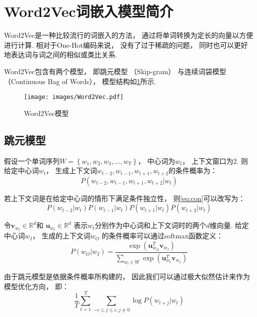 \section{Word2Vec词嵌入模型简介}

Word2Vec是一种比较流行的词嵌入的方法，
通过将单词转换为定长的向量以方便进行计算.
相对于One-Hot编码来说，
没有了过于稀疏的问题，
同时也可以更好地表达词与词之间的相似或类比关系.

Word2Vec包含有两个模型，
即跳元模型\cite{mikolovDistributedRepresentationsWords2013}
（Skip-gram）
与连续词袋模型\cite{mikolovEfficientEstimationWord2013}
（Continuous Bag of Words），
模型结构如\cref{fig:Word2Vec}所示.

\begin{figure}[!htbp]
    \centering
    \texttt{[image: images/Word2Vec.pdf]}
    \caption{Word2Vec模型}\label{fig:Word2Vec}
\end{figure}

\subsection{跳元模型}

假设一个单词序列$W = \left\{w_1, w_2, w_3, \ldots, w_T\right\}$，
中心词为$w_t$，
上下文窗口为$2$.
则给定中心词$w_t$，
生成上下文词$w_{t-2}, w_{t-1}, w_{t+1}, w_{t+2}$的条件概率为：
\begin{equation}
    \label{eq:con}
    P(w_{t-2}, w_{t-1}, w_{t+1}, w_{t+2}|w_t)
\end{equation}

若上下文词是在给定中心词的情形下满足条件独立性，
则\cref{eq:con}可以改写为：
\begin{equation}
    P(w_{t-2}|w_t)P(w_{t-1}|w_t)P(w_{t+1}|w_t)P(w_{t+2}|w_t)
\end{equation}

令$\mathbf{v}_{w_t}\in\mathbb{R}^d$和
$\mathbf{u}_{w_t}\in\mathbb{R}^d$
表示$w_t$分别作为中心词和上下文词时的两个$d$维向量.
给定中心词$w_I$，
生成的上下文词$w_O$
的条件概率可以通过softmax函数定义：
\begin{equation}
    P\left(w_O|w_I\right) = \frac{\exp\left(\mathbf{u}_{w_O}^T\mathbf{v}_{w_I}\right)}{\sum_{w_t\in W}\exp\left(\mathbf{u}_{w_t}^T\mathbf{v}_{w_I}\right)}
\end{equation}

由于跳元模型是依据条件概率所构建的，
因此我们可以通过极大似然估计来作为模型优化方向，
即：
\begin{equation}
    \frac{1}{T}\sum^T_{t=1}\sum_{-c\leqslant j\leqslant c, j\neq 0}\log P\left(w_{t+j}|w_t\right)
\end{equation}

